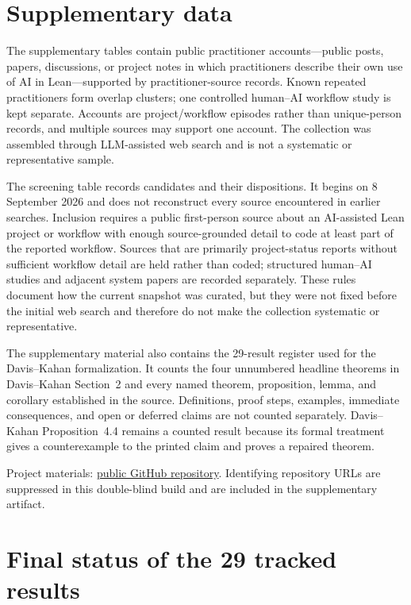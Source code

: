 \section{Supplementary data}
\label{app:data}

The supplementary tables contain \PractitionerAccountCount{} public
practitioner accounts---public posts, papers, discussions, or project notes in
which practitioners describe their own use of AI in Lean---supported by
\PractitionerSourceCount{} practitioner-source records.  Known repeated practitioners form
\PractitionerOverlapClusterCount{} overlap clusters; one controlled human--AI
workflow study is kept separate.  Accounts are project/workflow episodes rather
than unique-person records, and multiple sources may support one account.  The
collection was assembled through LLM-assisted web search and is not a systematic
or representative sample.

The screening table records \PractitionerScreenedCandidateCount{} candidates and
their dispositions.  It begins on 8 September 2026 and does not reconstruct
every source encountered in earlier searches.  Inclusion requires a public
first-person source about an AI-assisted Lean project or workflow with enough
source-grounded detail to code at least part of the reported workflow.  Sources
that are primarily project-status reports without sufficient workflow detail
are held rather than coded; structured human--AI studies and adjacent system
papers are recorded separately.  These rules document how the current snapshot
was curated, but they were not fixed before the initial web search and therefore
do not make the collection systematic or representative.

The supplementary material also contains the 29-result register used for the
Davis--Kahan formalization.  It counts the four unnumbered headline theorems in
Davis--Kahan Section~2 and every named theorem, proposition, lemma, and corollary
established in the source.  Definitions, proof steps, examples, immediate
consequences, and open or deferred claims are not counted separately.
Davis--Kahan Proposition~4.4 remains a counted result because its formal
treatment gives a counterexample to the printed claim and proves a repaired
theorem.

\ifshowartifacturl
Project materials: \href{\artifacturl}{public GitHub repository}.
\else
Identifying repository URLs are suppressed in this double-blind build and are
included in the supplementary artifact.
\fi

\section{Final status of the 29 tracked results}
\label{app:target-status}

